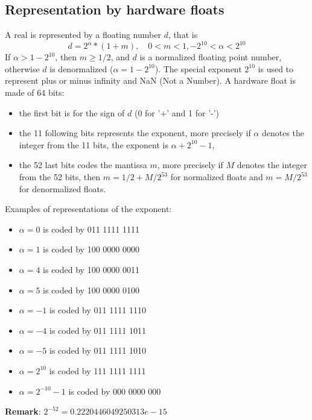 \documentclass[a4paper,11pt]{book}
\begin{document}
\subsection{Representation by hardware floats}
A real is represented by a floating number $d$, that is
\[ d=2^\alpha*(1+m),  \quad 0<m<1, -2^{10} < \alpha < 2^{10} \]
If $\alpha>1-2^{10}$, then $m \geq 1/2$, and $d$ is
a normalized floating point number, otherwise
$d$ is denormalized ($\alpha=1-2^{10}$). The special exponent $2^{10}$
is used to represent plus or minus infinity and NaN (Not a Number).
A hardware float is made of 64 bits:
\begin{itemize}
\item  the first bit is for the sign of $d$ (0 for '+' and 1 for '-')
\item  the 11 following bits represents the exponent, more precisely 
if $\alpha$ denotes the integer from the 11 bits,
the exponent is $\alpha+2^{10}-1$, 
\item  the 52 last bits codes the mantissa $m$, more precisely if
$M$ denotes the integer from the 52 bits, then
$m=1/2+M/2^{53}$ for normalized floats and $m=M/2^{53}$ for
denormalized floats.
\end{itemize}
Examples of representations of the exponent:
\begin{itemize}
\item $\alpha=0$ is coded by 011 1111 1111
\item $\alpha=1$ is coded by 100 0000 0000
\item $\alpha=4$ is coded by 100 0000 0011
\item $\alpha=5$ is coded by 100 0000 0100
\item $\alpha=-1$ is coded by 011 1111 1110
\item $\alpha=-4$ is coded by 011 1111 1011
\item $\alpha=-5$ is coded by 011 1111 1010
\item $\alpha=2^{10}$ is coded by 111 1111 1111
\item $\alpha=2^{-10}-1$ is coded by 000 0000 000
\end{itemize}
{\bf Remark}: $2^{-52}=0.2220446049250313e-15$
\end{document}

